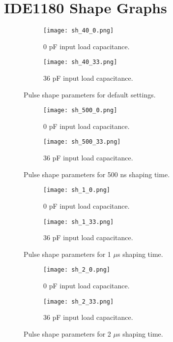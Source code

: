 \documentclass[../main/thesis.tex]{subfiles}
\begin{document}
\chapter{IDE1180 Shape Graphs}
\label{a-shape}

\begin{figure} [h!]%
	\centering
	\begin{subfigure}{.5\textwidth}
		\centering
		\texttt{[image: sh\_40\_0.png]}
		\caption{0 pF input load capacitance.}
		\label{fig-shape-40-0}
	\end{subfigure}%
	\begin{subfigure}{.5\textwidth}
		\centering
		\texttt{[image: sh\_40\_33.png]}
		\caption{36 pF input load capacitance.}
		\label{fig-shape-40-33} 
	\end{subfigure}
	\caption{Pulse shape parameters for default settings.}
	\label{fig-shape-def}
\end{figure}

\begin{figure} [h!]%
	\centering
	\begin{subfigure}{.5\textwidth}
		\centering
		\texttt{[image: sh\_500\_0.png]}
		\caption{0 pF input load capacitance.}
		\label{fig-shape-500-0}
	\end{subfigure}%
	\begin{subfigure}{.5\textwidth}
		\centering
		\texttt{[image: sh\_500\_33.png]}
		\caption{36 pF input load capacitance.}
		\label{fig-shape-500-33} 
	\end{subfigure}
	\caption{Pulse shape parameters for 500 ns shaping time.}
	\label{fig-shape-500}
\end{figure}

\begin{figure} %
	\centering
	\begin{subfigure}{.5\textwidth}
		\centering
		\texttt{[image: sh\_1\_0.png]}
		\caption{0 pF input load capacitance.}
		\label{fig-shape-1-0}
	\end{subfigure}%
	\begin{subfigure}{.5\textwidth}
		\centering
		\texttt{[image: sh\_1\_33.png]}
		\caption{36 pF input load capacitance.}
		\label{fig-shape-1-33} 
	\end{subfigure}
	\caption{Pulse shape parameters for 1 $\mu$s shaping time.}
	\label{fig-shape-1}
\end{figure}

\begin{figure} %
	\centering
	\begin{subfigure}{.5\textwidth}
		\centering
		\texttt{[image: sh\_2\_0.png]}
		\caption{0 pF input load capacitance.}
		\label{fig-shape-2-0}
	\end{subfigure}%
	\begin{subfigure}{.5\textwidth}
		\centering
		\texttt{[image: sh\_2\_33.png]}
		\caption{36 pF input load capacitance.}
		\label{fig-shape-2-33} 
	\end{subfigure}
	\caption{Pulse shape parameters for 2 $\mu$s shaping time.}
	\label{fig-shape-2}
\end{figure}
\end{document}
